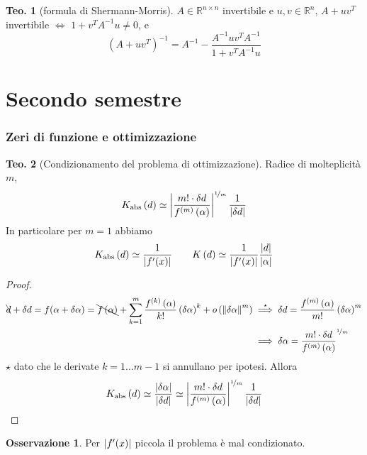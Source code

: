 \documentclass[a4paper,10pt]{article}
\theoremstyle{definition}
\theoremstyle{indentdefinition}
\theoremstyle{indenttheorem}
\newtheorem{thm}{Teo.}
\theoremstyle{myremark}
\newtheorem*{rem*}{Osservazione}
\theoremstyle{indentgeneral}
\theoremstyle{plain}
\theoremstyle{plain}
\newenvironment{myboxed} 
{\noindent\begin{lrbox}{\mybox}\begin{minipage}{\textwidth}}
{\end{minipage}\end{lrbox}\fbox{\usebox{\mybox}}}
\begin{document}
\begin{thm}[formula di Shermann-Morris]
$A\in\mathbb{R}^{n\times n}$ invertibile e $u,v\in\mathbb{R}^{n}$,
$A+uv^{T}$ invertibile $\Longleftrightarrow$ $1+v^{T}A^{-1}u\neq0$,
e
\[
\left(A+uv^{T}\right)^{-1}=A^{-1}-\frac{A^{-1}uv^{T}A^{-1}}{1+v^{T}A^{-1}u}
\]
\end{thm}

\pagebreak{}
\part{Secondo semestre}



\section{Zeri di funzione e ottimizzazione}
\begin{myboxed}
\begin{thm}[Condizionamento del problema di ottimizzazione]
Radice di molteplicità $m$, $$K_{\text{abs}}\left(d\right)\simeq\left|\frac{m!\cdot\delta d}{f^{\left(m\right)}\left(\alpha\right)}\right|^{\nicefrac{1}{m}}\frac{1}{\left|\delta d\right|}$$
In particolare per $m=1$ abbiamo
$$K_{\text{abs}}\left(d\right)\simeq\frac{1}{\abs{f'(x)}}\qquad K\left(d\right)\simeq\frac{1}{\abs{f'(x)}}\frac{\abs{d}}{\abs{\alpha}}$$
\end{thm}
\end{myboxed}

\begin{proof}
\begin{align*}
\bcancel{d}+\delta d=f(\alpha+\delta\alpha)=\bcancel{f\left(\alpha\right)}+\sum_{k=1}^{m}\frac{f^{\left(k\right)}\left(\alpha\right)}{k!}\left(\delta\alpha\right)^{k}+o\left(\left\Vert \delta\alpha\right\Vert ^{m}\right)&\overset{\star}{\implies} \delta d=\frac{f^{\left(m\right)}\left(\alpha\right)}{m!}\left(\delta\alpha\right)^{m}\\
&\implies\delta\alpha=\frac{m!\cdot\delta d}{f^{\left(m\right)}\left(\alpha\right)}^{\nicefrac{1}{m}}
\end{align*}
$\star$ dato che le derivate $k=1\ldots m-1$ si annullano per ipotesi. Allora
$$K_{\text{abs}}\left(d\right)\simeq \frac{\abs{\delta\alpha}}{\abs{\delta d}} \simeq\left|\frac{m!\cdot\delta d}{f^{\left(m\right)}\left(\alpha\right)}\right|^{\nicefrac{1}{m}}\frac{1}{\left|\delta d\right|}$$
\end{proof}

\begin{rem*}
    Per $\abs{f'(x)}$ piccola il problema è mal condizionato.
\end{rem*}
\end{document}
